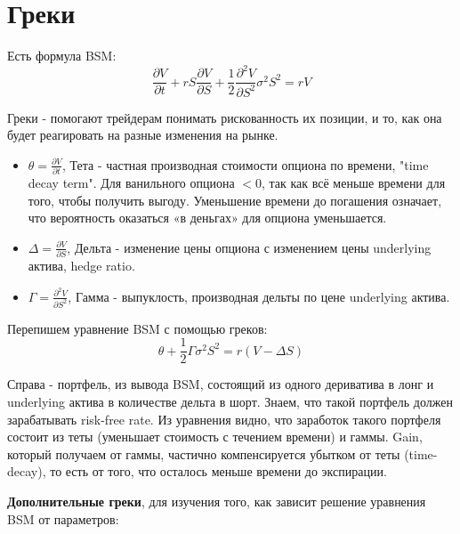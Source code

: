 \documentclass{article}
\begin{document}
\section{Греки}

Есть формула BSM:
\[\frac{\partial V}{\partial t} + r S \frac{\partial V}{\partial S} + \frac{1}{2}\frac{\partial^2 V}{\partial S^2}\sigma^2 S^2 = rV\]

Греки - помогают трейдерам понимать рискованность их позиции, и то, как она будет реагировать на разные изменения на рынке.

\begin{itemize}

    \item \(\theta = \frac{\partial V}{\partial t}\), Тета - частная производная стоимости опциона по времени, "time decay term". Для ванильного опциона \(<0\), так как всё меньше времени для того, чтобы получить выгоду. Уменьшение времени до погашения означает, что вероятность оказаться «в деньгах» для опциона уменьшается.
    
    \item \(\Delta = \frac{\partial V}{\partial S}\), Дельта - изменение цены опциона с изменением цены underlying актива, hedge ratio. 
    
    \item \(\Gamma = \frac{\partial^2 V}{\partial S^2}\), Гамма - выпуклость, производная дельты по цене underlying актива. 
\end{itemize}

Перепишем уравнение BSM с помощью греков:
\[\theta +  \frac{1}{2}\Gamma\sigma^2 S^2 = r(V-\Delta S)\]

Справа - портфель, из вывода BSM, состоящий из одного дериватива в лонг и underlying актива в количестве дельта в шорт. Знаем, что такой портфель должен зарабатывать risk-free rate. Из уравнения видно, что заработок такого портфеля состоит из теты (уменьшает стоимость с течением времени) и гаммы. Gain, который получаем от гаммы, частично компенсируется убытком от теты (time-decay), то есть от того, что осталось меньше времени до экспирации. 

\textbf{Дополнительные греки}, для изучения того, как зависит решение уравнения BSM от параметров:
\end{document}
